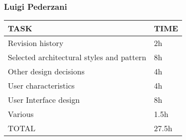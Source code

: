 \subsubsection{Luigi Pederzani}
\hfill
\begin{center}
	\begin{tabular}{ | l | p{6cm} | } 
		\hline
		TASK & TIME \\ 
		\hline
		Revision history & 2h  \\ 
		\hline
		Selected architectural styles and pattern & 8h  \\ 
		\hline
		Other design decisions  & 4h \\ 
		\hline
		User characteristics & 4h \\ 
		\hline
		User Interface design & 8h \\ 
		\hline
		Various & 1.5h  \\ 
		\hline
		TOTAL & 27.5h \\ 
		\hline
	\end{tabular}
\end{center}

